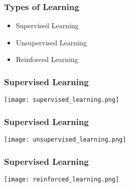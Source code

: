 \documentclass[xcolor=table]{beamer}
\begin{document}
\begin{frame}[t]
\frametitle{Types of Learning}
\begin{itemize}
    \item Supervised Learning
    \item Unsupervised Learning
    \item Reinforced Learning 
\end{itemize}
\end{frame}

\begin{frame}[t]
\frametitle{Supervised Learning}
\begin{center}
\texttt{[image: supervised\_learning.png]}
\end{center}
\end{frame}

\begin{frame}[t]
\frametitle{Supervised Learning}
\begin{center}
\texttt{[image: unsupervised\_learning.png]}
\end{center}
\end{frame}

\begin{frame}[t]
\frametitle{Supervised Learning}
\begin{center}
\texttt{[image: reinforced\_learning.png]}
\end{center}
\end{frame}
\end{document}
